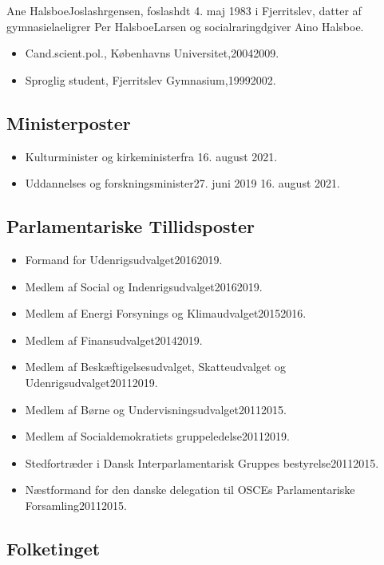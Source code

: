 \documentclass[11pt, a4paper]{awesome-cv}
\begin{document}
\makecvheader[R]
\makelettertitle
\begin{cvletter}
Ane HalsboeJoslashrgensen, foslashdt 4. maj 1983 i Fjerritslev, datter af gymnasielaeligrer Per HalsboeLarsen og socialraringdgiver Aino Halsboe.

\begin{itemize}
\item Cand.scient.pol., Københavns Universitet,20042009.
\item Sproglig student, Fjerritslev Gymnasium,19992002.
\end{itemize}
\subsection*{Ministerposter}
\begin{itemize}
\item Kulturminister og kirkeministerfra 16. august 2021.
\item Uddannelses og forskningsminister27. juni 2019  16. august 2021.
\end{itemize}
\subsection*{Parlamentariske Tillidsposter}
\begin{itemize}
\item Formand for Udenrigsudvalget20162019.
\item Medlem af Social og Indenrigsudvalget20162019.
\item Medlem af Energi Forsynings og Klimaudvalget20152016.
\item Medlem af Finansudvalget20142019.
\item Medlem af Beskæftigelsesudvalget, Skatteudvalget og Udenrigsudvalget20112019.
\item Medlem af Børne og Undervisningsudvalget20112015.
\item Medlem af Socialdemokratiets gruppeledelse20112019.
\item Stedfortræder i Dansk Interparlamentarisk Gruppes bestyrelse20112015.
\item Næstformand for den danske delegation til OSCEs Parlamentariske Forsamling20112015.
\end{itemize}
\subsection*{Folketinget}

\end{cvletter}
\end{document}
